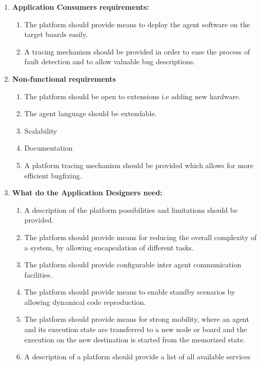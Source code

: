 \documentclass{scrreprt}
\begin{document}
\begin{enumerate}

\item\textbf{Application Consumers requirements:}
\begin{enumerate}
\item The platform should provide means to deploy the agent software on the target boards easily.
\item A tracing mechanism should be provided in order to ease the process of fault detection and to allow valuable bug descriptions.
\end{enumerate}


\item\textbf{Non-functional requirements}

\begin{enumerate}
\item The platform should be open to extensions i.e adding new hardware.
\item The agent language should be extendable.
\item Scalability
\item Documentation 
\item A platform tracing mechanism should be provided which allows for more efficient bugfixing.
\end{enumerate}


\item\textbf{What do the Application Designers need:}
\begin{enumerate}
\item A description of the platform possibilities and limitations should be provided.
\item The platform should provide means for reducing the overall complexity of a system, by allowing encapsulation of different tasks.
\item The platform should provide configurable inter agent communication facilities.
\item The platform should provide means to enable standby scenarios by allowing dynamical code reproduction.
\item The platform should provide means for strong mobility, where an agent and its execution state are transferred to a new node or board and
   the execution on the new destination is started from the memorized state.
\item A description of a platform should provide a list of all available services
\end{enumerate}

\end{enumerate}
\end{document}
